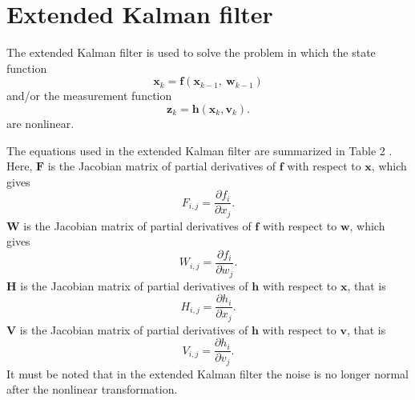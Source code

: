 \documentclass[12pt]{article}
\begin{document}

\section{Extended Kalman filter}\label{extended-kalman-filter}

The extended Kalman filter is used to solve the problem in which the state function
%
\begin{equation}
	\mathbf{x}_{k} = \mathbf{f}( \mathbf{x}_{k - 1},\ \mathbf{w}_{k - 1})
\end{equation}
and/or the measurement function
%
\begin{equation}
	\mathbf{z}_{k} = \mathbf{h}( \mathbf{x}_{k},\mathbf{v}_{k}).
\end{equation}
%
are nonlinear.

The equations used in the extended Kalman filter are summarized in Table 2 \cite{Welch}. Here, \(\mathbf{F}\) is the Jacobian matrix of partial derivatives of \(\mathbf{f}\) with respect to \(\mathbf{x}\), which gives
%
\begin{equation}
	F_{i,j} = \frac{\partial f_{i}}{\partial x_{j}}.
\end{equation}
%
\(\mathbf{W}\) is the Jacobian matrix of partial derivatives of \(\mathbf{f}\) with respect to \(\mathbf{w}\), which gives
%
\begin{equation}
	W_{i,j} = \frac{\partial f_{i}}{\partial w_{j}}.
\end{equation}
%
\(\mathbf{H}\) is the Jacobian matrix of partial derivatives of \(\mathbf{h}\) with respect to \(\mathbf{x}\), that is
%
\begin{equation}
	H_{i,j} = \frac{\partial h_{i}}{\partial x_{j}}.
\end{equation}
%
\(\mathbf{V}\) is the Jacobian matrix of partial derivatives of \(\mathbf{h}\) with respect to \(\mathbf{v}\), that is
%
\begin{equation}
	V_{i,j} = \frac{\partial h_{i}}{\partial v_{j}}.
\end{equation}
%
It must be noted that in the extended Kalman filter the noise is no
longer normal after the nonlinear transformation.
\end{document}
